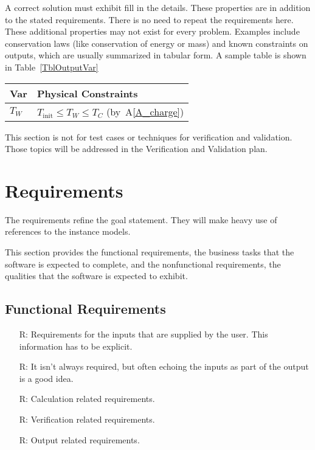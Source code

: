 \documentclass[12pt]{article}
\newcommand{\aref}[1]{A\ref{#1}}
\newcounter{reqnum} %
\begin{document}
A correct solution must exhibit fill in the details.  These properties are in
addition to the stated requirements.  There is no need to repeat the
requirements here.  These additional properties may not exist for every problem.
Examples include conservation laws (like conservation of energy or mass) and
known constraints on outputs, which are usually summarized in tabular form.  A
sample table is shown in Table~\ref{TblOutputVar}

\begin{table}[!h]
\caption{Output Variables} \label{TblOutputVar}
\renewcommand{\arraystretch}{1.2}
\noindent \begin{longtable*}{l l} 
  \toprule
  \textbf{Var} & \textbf{Physical Constraints} \\
  \midrule 
  $T_W$ & $T_\text{init} \leq T_W \leq T_C$ (by~\aref{A_charge})
  \\
  \bottomrule
\end{longtable*}
\end{table}

This section is not for test cases or techniques for verification and
validation.  Those topics will be addressed in the Verification and Validation
plan.

\section{Requirements}

The requirements refine the goal statement.  They will make heavy use of
references to the instance models.

This section provides the functional requirements, the business tasks that the
software is expected to complete, and the nonfunctional requirements, the
qualities that the software is expected to exhibit.

\subsection{Functional Requirements}

\noindent \begin{itemize}

\item[R\refstepcounter{reqnum}\thereqnum \label{R_Inputs}:] Requirements
    for the inputs that are supplied by the user.  This information has to be
    explicit.

\item[R\refstepcounter{reqnum}\thereqnum \label{R_OutputInputs}:] It isn't
    always required, but often echoing the inputs as part of the output is a
    good idea.

\item[R\refstepcounter{reqnum}\thereqnum \label{R_Calculate}:] Calculation
    related requirements.

\item[R\refstepcounter{reqnum}\thereqnum \label{R_VerifyOutput}:]
  Verification related requirements.

\item[R\refstepcounter{reqnum}\thereqnum \label{R_Output}:] Output related
    requirements.

\end{itemize}
\end{document}
